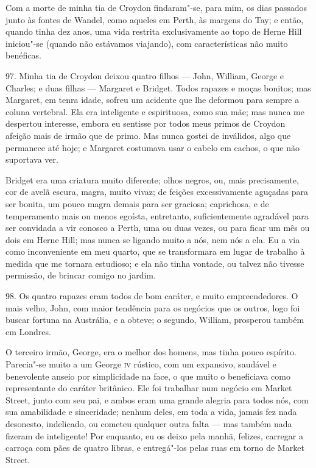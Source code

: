 Com a morte de minha tia de Croydon findaram"-se, para mim, os dias
passados junto às fontes de Wandel, como aqueles em Perth, às margens do
Tay; e então, quando tinha dez anos, uma vida restrita exclusivamente ao
topo de Herne Hill iniciou"-se (quando não estávamos viajando), com
características não muito benéficas.

97. Minha tia de Croydon deixou quatro filhos --- John, William, George e
Charles; e duas filhas --- Margaret e Bridget. Todos rapazes e moças
bonitos; mas Margaret, em tenra idade, sofreu um acidente que lhe
deformou para sempre a coluna vertebral. Ela era inteligente e
espirituosa, como sua mãe; mas nunca me despertou interesse, embora eu
sentisse por todos meus primos de Croydon afeição mais de irmão que de
primo. Mas nunca gostei de inválidos, algo que permanece até hoje; e
Margaret costumava usar o cabelo em cachos, o que não suportava ver.

Bridget era uma criatura muito diferente; olhos negros, ou, mais
precisamente, cor de avelã escura, magra, muito vivaz; de feições
excessivamente aguçadas para ser bonita, um pouco magra demais para ser
graciosa; caprichosa, e de temperamento mais ou menos egoísta,
entretanto, suficientemente agradável para ser convidada a vir conosco a
Perth, uma ou duas vezes, ou para ficar um mês ou dois em Herne Hill;
mas nunca se ligando muito a nós, nem nós a ela. Eu a via como
inconveniente em meu quarto, que se transformara em lugar de trabalho à
medida que me tornara estudioso; e ela não tinha vontade, ou talvez não
tivesse permissão, de brincar comigo no jardim.

98. Os quatro rapazes eram todos de bom caráter, e muito empreendedores.
O mais velho, John, com maior tendência para os negócios que os outros,
logo foi buscar fortuna na Austrália, e a obteve; o segundo, William,
prosperou também em Londres.

O terceiro irmão, George, era o melhor dos homens, mas tinha pouco
espírito. Parecia"-se muito a um George \textsc{iv} rústico, com um expansivo,
saudável e benevolente anseio por simplicidade na face, o que muito o
beneficiava como representante do caráter britânico. Ele foi trabalhar
num negócio em Market Street, junto com seu pai, e ambos eram uma grande
alegria para todos nós, com sua amabilidade e sinceridade; nenhum deles,
em toda a vida, jamais fez nada desonesto, indelicado, ou cometeu
qualquer outra falta --- mas também nada fizeram de inteligente! Por
enquanto, eu os deixo pela manhã, felizes, carregar a carroça com pães
de quatro libras, e entregá"-los pelas ruas em torno de Market Street.

